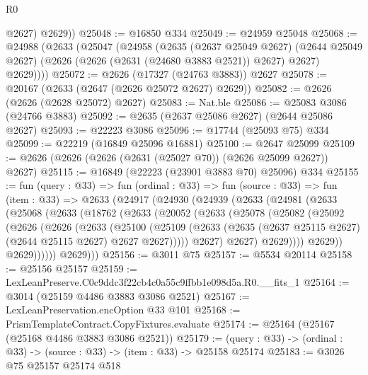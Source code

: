 \begin{lexlean}{R0}
\begin{coremodule}
          @2627)
        @2629))
@25048 := @16850 @334
@25049 := @24959 @25048
@25068 := @24988
    (@2633
      (@25047
        (@24958
          (@2635
            (@2637 @25049 @2627)
            (@2644 @25049 @2627)
            (@2626 (@2626 (@2631 (@24680 @3883 @2521)) @2627) @2627)
            @2629))))
@25072 := @2626 (@17327 (@24763 @3883)) @2627
@25078 := @20167 (@2633 (@2647 (@2626 @25072 @2627) @2629))
@25082 := @2626 (@2626 (@2628 @25072) @2627)
@25083 := Nat.ble
@25086 := @25083 @3086 (@24766 @3883)
@25092 := @2635 (@2637 @25086 @2627) (@2644 @25086 @2627)
@25093 := @22223 @3086
@25096 := @17744 (@25093 @75) @334
@25099 := @22219 (@16849 @25096 @16881)
@25100 := @2647 @25099
@25109 := @2626 (@2626 (@2626 (@2631 (@25027 @70)) (@2626 @25099 @2627)) @2627)
@25115 := @16849 (@22223 (@23901 @3883 @70) @25096) @334
@25155 := fun (query : @33) =>
  fun (ordinal : @33) =>
  fun (source : @33) =>
  fun (item : @33) =>
  @2633
    (@24917
      (@24930
        (@24939
          (@2633
            (@24981
              (@2633
                (@25068
                  (@2633
                    (@18762
                      (@2633
                        (@20052
                          (@2633
                            (@25078
                              (@25082
                                (@25092
                                  (@2626
                                    (@2626
                                      (@2633
                                        (@25100
                                          (@25109
                                            (@2633
                                              (@2635
                                                (@2637 @25115 @2627)
                                                (@2644 @25115 @2627)
                                                @2627
                                                @2627)))))
                                      @2627)
                                    @2627)
                                  @2629))))
                          @2629))
                      @2629))))))
          @2629)))
@25156 := @3011 @75
@25157 := @5534 @20114
@25158 := @25156 @25157
@25159 := LexLeanPreserve.C0c9ddc3f22cb4c0a55c9ffbb1e098d5a.R0.__fits_1
@25164 := @3014 (@25159 @4486 @3883 @3086 @2521)
@25167 := LexLeanPreservation.encOption @33 @101
@25168 := PrismTemplateContract.CopyFixtures.evaluate
@25174 := @25164 (@25167 (@25168 @4486 @3883 @3086 @2521))
@25179 := (query : @33) -> (ordinal : @33) -> (source : @33) -> (item : @33) -> @25158 @25174
@25183 := @3026 @75 @25157 @25174 @518

\end{coremodule}
\end{lexlean}
